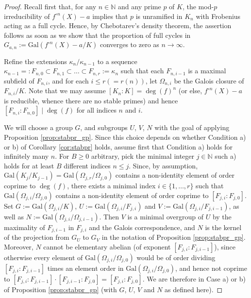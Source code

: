 \documentclass[a4paper]{amsart}
\begin{document}
  \begin{proof} 
 Recall first that, for any $n\in \mathbb{N}$ and any prime $p$ of $K$, the mod-$p$ irreducibility of $f^{\circ n}(X)-a$ implies that $p$ is unramified in $K_n$ with Frobenius acting as a full cycle. Hence, by Chebotarev's density theorem, the assertion follows as soon as we show that the proportion of full cycles in $G_{a,n}:=\textrm{Gal}(f^{\circ n}(X)-a/K)$ converges to zero as $n\to \infty$.
  
  Refine the extensions $\kappa_{n}/\kappa_{n-1}$ to a sequence $\kappa_{n-1}=:F_{n,0}\subset F_{n,1}\subset\dots\subset F_{n,r}:=\kappa_n$ such that each $F_{n,i-1}$ is a maximal subfield of $F_{n,i}$, and for each $i\le r (=r(n))$, let $\Omega_{n,i}$ be the Galois closure of $F_{n,i}/K$. Note that we may assume $[K_n:K]=\deg(f)^n$ (or else, $f^{\circ n}(X)-a$ is reducible, whence there are no stable primes) and hence $[F_{n,i}:F_{n,0}]\mid \deg(f)$ for all indices $n$ and $i$. 

We will choose a group $G$, and subgroups $U$, $V$, $N$ with the goal of applying Proposition \ref{prop:stabpr_gp}.
 Since this choice depends on whether Condition a) or b) of Corollary \ref{cor:stabpr} holds, 
assume first that Condition a) holds for infinitely many $n$. For $B\ge 0$ arbitrary, pick the minimal integer $j\in \mathbb{N}$ such a) holds for at least $B$ different indices $n\le j$. 
  Since, by assumption, $\mathrm{Gal}(K_j/K_{j-1}) = \mathrm{Gal}(\Omega_{j,r}/\Omega_{j,0})$ contains a non-identity element of order coprime to $\deg(f)$, there exists a minimal index $i\in \{1,\dots,r\}$ such that 
  $\mathrm{Gal}(\Omega_{j,i}/\Omega_{j,0})$ contains a non-identity element of order coprime to $[F_{j,i}:F_{j,0}]$. 
  Set $G:=\textrm{Gal}(\Omega_{j,i}/K)$, $U:=\textrm{Gal}(\Omega_{j,i}/F_{j,i})$ and $V:=\textrm{Gal}(\Omega_{j,i}/F_{j,i-1})$, as well as $N:=\mathrm{Gal}(\Omega_{j,i}/\Omega_{j,i-1})$.
  Then $V$ is a minimal overgroup of $U$ by the maximality of $F_{j,i-1}$ in $F_{j,i}$ and the Galois correspondence, and $N$ is the kernel of the projection from $G_U$ to $G_V$ in the notation of Proposition \ref{prop:stabpr_gp}.
Moreover, $N$ cannot be elementary abelian (of exponent $[F_{j,i}:F_{j,i-1}]$), since otherwise every element of $\mathrm{Gal}(\Omega_{j,i}/\Omega_{j,0})$ would be of order dividing $[F_{j,i}:F_{j,i-1}]$ times an element order in $\mathrm{Gal}(\Omega_{j,i}/\Omega_{j,0})$, and hence not coprime to $[F_{j,i}:F_{j,i-1}]\cdot [F_{j,i-1}:F_{j,0}] = [F_{j,i}:F_{j,0}]$. We are therefore in Case a) or b) of Proposition \ref{prop:stabpr_gp} (with $G$, $U$, $V$ and $N$ as defined here).


\end{proof}
\end{document}
